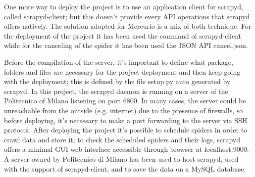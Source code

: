 One more way to deploy the project is to use an application client for scrapyd, called scrapyd-client\cite{scrapydclient}; but this doesn't provide every API operations that scrapyd offers natively. The solution adopted for Mercurio is a mix of both technique. 
For the deployment of the project it has been used  the command of scrapyd-client while for the canceling of the spider it has been used the JSON API cancel.json.
\par
Before the compilation of the server, it's important to define what package, folders and files are necessary for the project deployment and then keep going with the deployment; this is defined by the file setup.py auto generated by scrapyd. 
In this project, the scrapyd daemon is running on a server of the Politecnico of Milano listening on port 6800. 
In many cases, the server could be unreachable from the outside (e.g. internet) due to the presence of firewalls, so before deploying, it's necessary to make a port forwarding to the server via SSH protocol. 
After deploying the project it's possible to schedule spiders in order to crawl data and store it; to check the scheduled spiders and their logs, scrapyd offers a minimal GUI web interface accessible through browser at localhost:9000. \\
A server owned by Politecnico di Milano has been used to host scrapyd, used with the support of scrapyd-client, and to save the data on a MySQL database.